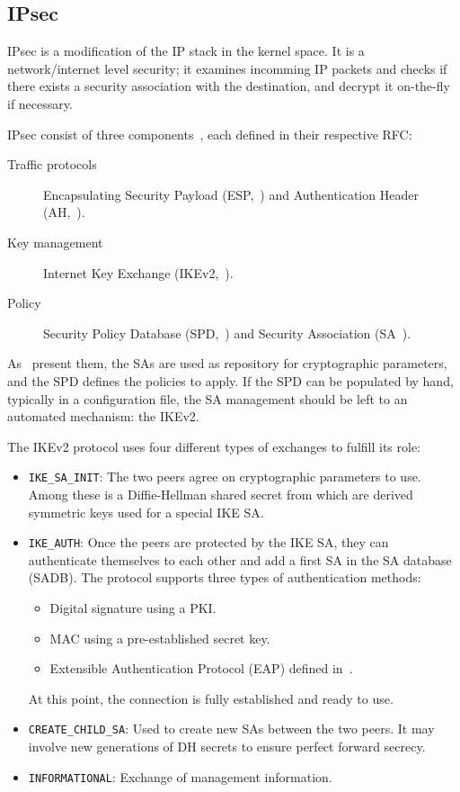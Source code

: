 \subsection{IPsec}
IPsec is a modification of the IP stack in the kernel space.
It is a network/internet level security; it examines incomming IP packets and checks if there exists a security association with the destination, and decrypt it on-the-fly if necessary.


IPsec consist of three components~\cite{cryptoencyclopedia2011}, each defined in their respective RFC:
\begin{description}
	\item[Traffic protocols] Encapsulating Security Payload (ESP,~\cite{rfc4303}) and Authentication Header (AH,~\cite{rfc4302}).
	\item[Key management] Internet Key Exchange (IKEv2,~\cite{rfc7296}).
	\item[Policy]Security Policy Database (SPD,~\cite{rfc4301}) and Security Association (SA~\cite{rfc4301}).
\end{description}

As~\citet{Paterson200672} present them, the SAs are used as repository for cryptographic parameters, and the SPD defines the policies to apply.
If the SPD can be populated by hand, typically in a configuration file, the SA management should be left to an automated mechanism: the IKEv2.

\noindent The IKEv2 protocol uses four different types of exchanges to fulfill its role:
\begin{itemize}
	\item \texttt{IKE\_SA\_INIT}: The two peers agree on cryptographic parameters to use. Among these is a Diffie-Hellman shared secret from which are derived symmetric keys used for a special IKE SA.
	\item \texttt{IKE\_AUTH}: Once the peers are protected by the IKE SA, they can authenticate themselves to each other and add a first SA in the SA database (SADB).
	The protocol supports three types of authentication methods:
	\begin{itemize}
		\item Digital signature using a PKI.
		\item MAC using a pre-established secret key.
		\item Extensible Authentication Protocol (EAP) defined in~\citet{rfc3748}.
	\end{itemize}
	At this point, the connection is fully established and ready to use.
	\item \texttt{CREATE\_CHILD\_SA}: Used to create new SAs between the two peers. It may involve new generations of DH secrets to ensure perfect forward secrecy.
	\item \texttt{INFORMATIONAL}: Exchange of management information.
\end{itemize}
~\newline{}

